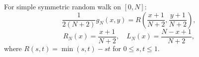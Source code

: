 For simple symmetric random walk on \([0,N]\):
\[
\frac{1}{2(N+2)} g_N(x,y) = R\!\left(\frac{x+1}{N+2}, \frac{y+1}{N+2}\right),
\]
\[
R_N(x) = \frac{x+1}{N+2}, \quad L_N(x) = \frac{N-x+1}{N+2},
\]
where \(R(s,t) = \min(s,t) - st\) for \(0 \leq s,t \leq 1\).
